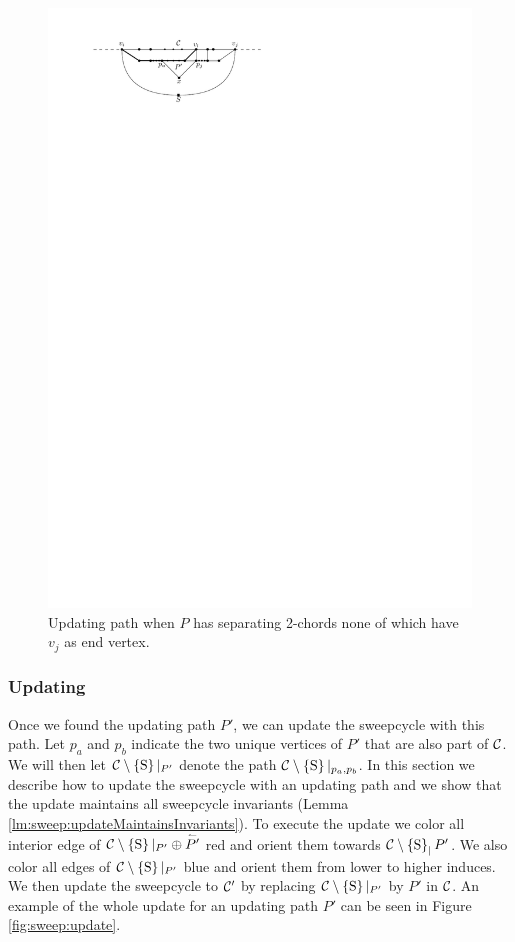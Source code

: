       \begin{figure}[b]
        \centering
        \includegraphics[scale=1]{unifiedAlgo/img/sweep/cases/free2chord}
        \caption{Updating path when $P$ has separating 2-chords none of which have $v_j$ as end vertex.}
        \label{fig:sweep:free2chord}
      \end{figure}

\subsubsection{Updating}
  \label{sss:sweep:update}
  Once we found the updating path $P'$, we can update the sweepcycle with this path.  Let $p_a$ and $p_b$ indicate the two unique vertices of $P'$ that are also part of $\mathcal{C}$. We will then let $\mathcal{C} \setminus \left\lbrace {\mathrm{S}} \right\rbrace|_{P'}$ denote the path $\mathcal{C} \setminus \left\lbrace {\mathrm{S}} \right\rbrace|_{p_a, p_b}$.
  In this section we describe how to update the sweepcycle with an updating path and we show that the update maintains all sweepcycle invariants (Lemma \ref{lm:sweep:updateMaintainsInvariants}).
  To execute the update we color all interior edge of $\mathcal{C} \setminus \left\lbrace {\mathrm{S}} \right\rbrace|_{P'} \oplus \accentset{\leftharpoonup}{P'}$ red and orient them towards $\mathcal{C} \setminus \left\lbrace {\mathrm{S}} \right\rbrace_|{P'}$.
  We also color all edges of $\mathcal{C} \setminus \left\lbrace {\mathrm{S}} \right\rbrace|_{P'}$  blue and orient them from lower to higher induces.
  We then update the sweepcycle to $\mathcal{C}'$ by replacing $\mathcal{C} \setminus \left\lbrace {\mathrm{S}} \right\rbrace|_{P'}$ by $P'$ in $\mathcal{C}$.
  An example of the whole update for an updating path $P'$ can be seen in Figure \ref{fig:sweep:update}.

